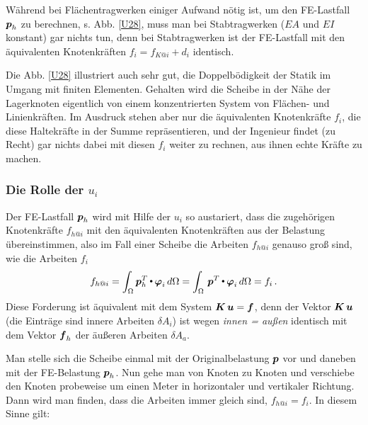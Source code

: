 W\"{a}hrend bei Fl\"{a}chentragwerken einiger Aufwand n\"{o}tig ist, um den FE-Lastfall $\mbox{\boldmath $p$}_h$ zu berechnen, s. Abb. \ref{U28}, muss man bei Stabtragwerken ($EA$ und $EI$ konstant) gar nichts tun, denn bei Stabtragwerken ist der FE-Lastfall mit den \"{a}quivalenten Knotenkr\"{a}ften $f_i = f_{K @ i} + d_i$ identisch.\\

\begin{remark}
Die Abb. \ref{U28} illustriert auch sehr gut, die \glq Doppelb\"{o}digkeit\grq{} der Statik im Umgang mit finiten Elementen. Gehalten wird die Scheibe in der N\"{a}he der Lagerknoten eigentlich von einem konzentrierten System von Fl\"{a}chen- und Linienkr\"{a}ften. Im Ausdruck stehen aber nur die \"{a}quivalenten Knotenkr\"{a}fte $f_i$, die diese Haltekr\"{a}fte in der \glq Summe\grq{} repr\"{a}sentieren, und der Ingenieur findet (zu Recht) gar nichts dabei mit diesen $f_i$ weiter zu rechnen, aus ihnen echte Kr\"{a}fte zu machen.
\end{remark}
\vspace{-0.5cm}
{\textcolor{sectionTitleBlue}{\subsubsection*{Die Rolle der $u_i$}}}

Der FE-Lastfall $\mbox{\boldmath $p$}_h$ wird mit Hilfe der $u_i$ so austariert, dass die zugeh\"{o}rigen Knotenkr\"{a}fte $f_{h @i}$ mit den \"{a}quivalenten Knotenkr\"{a}ften aus der Belastung \"{u}bereinstimmen, also im Fall einer Scheibe die Arbeiten $f_{h @i}$ genauso gro{\ss} sind, wie die Arbeiten $f_i$
\begin{align}\label{Eq123}
f_{h @i} = \int_{\Omega} \mbox{\boldmath $p$}_h^T {\,\scriptscriptstyle \stackrel{\bullet}{{}}}\, \mbox{\boldmath $\varphi$}_i\,d\Omega = \int_{\Omega}\,\mbox{\boldmath $p$}^T {\,\scriptscriptstyle \stackrel{\bullet}{{}}}\, \mbox{\boldmath $\varphi$}_i\,d\Omega = f_i\,.
\end{align}
Diese Forderung ist \"{a}quivalent mit dem System $\mbox{\boldmath $K$}\,\mbox{\boldmath $u$} = \mbox{\boldmath $f$}$, denn der Vektor $\mbox{\boldmath $K$}\,\mbox{\boldmath $u$}$ (die Eintr\"{a}ge sind innere Arbeiten $\delta A_i$) ist wegen {\em \glq innen = au{\ss}en\grq{}\/} identisch mit dem Vektor $\mbox{\boldmath $f$}_h$ der \"{a}u{\ss}eren Arbeiten $\delta A_a$.

Man stelle sich die Scheibe einmal mit der Originalbelastung $\mbox{\boldmath $p$}$ vor und daneben mit der FE-Belastung $\mbox{\boldmath $p$}_h$. Nun gehe man von Knoten zu Knoten und verschiebe den Knoten probeweise um einen Meter in horizontaler und vertikaler Richtung. Dann wird man finden, dass die Arbeiten immer gleich sind, $f_{h @i} = f_i$. In diesem Sinne gilt:\\

